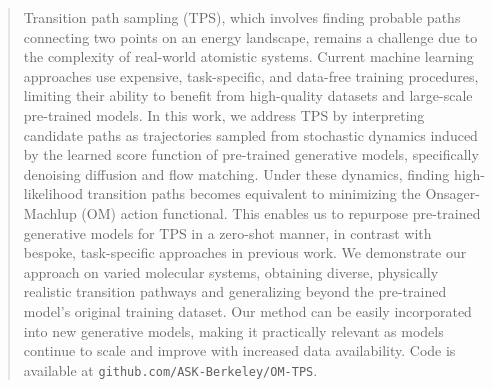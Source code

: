 \begin{abstract}
Transition path sampling (TPS), which involves finding probable paths connecting two points on an energy landscape, remains a challenge due to the complexity of real-world atomistic systems. Current machine learning approaches use expensive, task-specific, and data-free training procedures, limiting their ability to benefit from high-quality datasets and large-scale pre-trained models. In this work, we address TPS by interpreting candidate paths as trajectories sampled from stochastic dynamics induced by the learned score function of pre-trained generative models, specifically denoising diffusion and flow matching. Under these dynamics, finding high-likelihood transition paths becomes equivalent to minimizing the Onsager-Machlup (OM) action functional. This enables us to repurpose pre-trained generative models for TPS in a zero-shot manner, in contrast with bespoke, task-specific approaches in previous work. We demonstrate our approach on varied molecular systems, obtaining diverse, physically realistic transition pathways and generalizing beyond the pre-trained model's original training dataset. Our method can be easily incorporated into new generative models, making it practically relevant as models continue to scale and improve with increased data availability. Code is available at \texttt{github.com/ASK-Berkeley/OM-TPS}.
\end{abstract}

